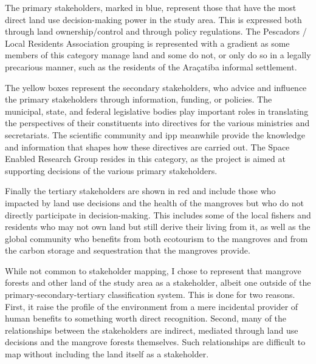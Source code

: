 The primary stakeholders, marked in blue, represent those that have the most direct land use decision-making power in the study area. This is expressed both through land ownership/control and through policy regulations. The Pescadors / Local Residents Association grouping is represented with a gradient as some members of this category manage land and some do not, or only do so in a legally precarious manner, such as the residents of the Araçatiba informal settlement. 

The yellow boxes represent the secondary stakeholders, who advice and influence the primary stakeholders through information, funding, or policies. The municipal, state, and federal legislative bodies play important roles in translating the perspectives of their constituents into directives for the various ministries and secretariats. The scientific community and \ac{ipp} meanwhile provide the knowledge and information that shapes how these directives are carried out. The Space Enabled Research Group resides in this category, as the project is aimed at supporting decisions of the various primary stakeholders. 

Finally the tertiary stakeholders are shown in red and include those who impacted by land use decisions and the health of the mangroves but who do not directly participate in decision-making. This includes some of the local fishers and residents who may not own land but still derive their living from it, as well as the global community who benefits from both ecotourism to the mangroves and from the carbon storage and sequestration that the mangroves provide.

While not common to stakeholder mapping, I chose to represent that mangrove forests and other land of the study area as a stakeholder, albeit one outside of the primary-secondary-tertiary classification system. This is done for two reasons. First, it raise the profile of the environment from a mere incidental provider of human benefits to something worth direct recognition. Second, many of the relationships between the stakeholders are indirect, mediated through land use decisions and the mangrove forests themselves. Such relationships are difficult to map without including the land itself as a stakeholder.

